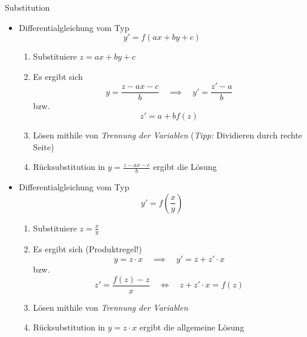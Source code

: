 \documentclass[german]{../spicker}
\begin{document}
\begin{algo}{Substitution}
    \begin{itemize}
        \item Differentialgleichung vom Typ
              $$
                  \boxed{y' = f(ax + by + c)}
              $$
              \begin{enumerate}
                  \item Substituiere $z = ax + by + c$
                  \item Es ergibt sich
                        $$
                            y = \frac{z -ax - c}{b} \quad \implies \quad y' = \frac{z' - a}{b}
                        $$
                        bzw.
                        $$
                            z' = a + bf(z)
                        $$
                  \item Lösen mithile von \emph{Trennung der Variablen} (\emph{Tipp:} Dividieren durch rechte Seite)
                  \item Rücksubstitution in $y = \frac{z -ax - c}{b}$ ergibt die Lösung
              \end{enumerate}
        \item Differentialgleichung vom Typ
              $$
                  \boxed{y' = f\left(\frac{x}{y}\right)}
              $$
              \begin{enumerate}
                  \item Substituiere $z = \frac{x}{y}$
                  \item Es ergibt sich (Produktregel!)
                        $$
                            y = z \cdot x \quad \implies \quad y' = z + z' \cdot x
                        $$
                        bzw.
                        $$
                            z' = \frac{f(z) - z}{x} \quad \iff \quad z + z' \cdot x = f(z)
                        $$
                  \item Lösen mithile von \emph{Trennung der Variablen}
                  \item Rücksubstitution in $y = z \cdot x$ ergibt die allgemeine Lösung
              \end{enumerate}
    \end{itemize}
\end{algo}
\end{document}
